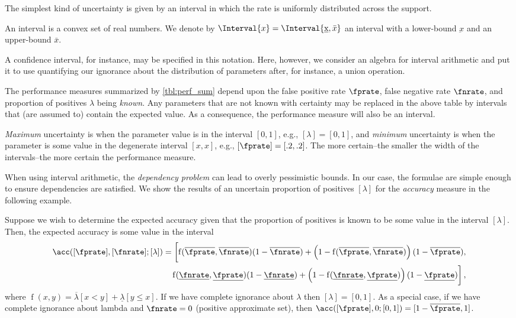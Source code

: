 \documentclass[ ../main.tex]{subfiles}
\begin{document}
The simplest kind of uncertainty is given by an interval in which the rate is uniformly distributed across the support.
\begin{definition}
An interval is a convex set of real numbers.
We denote by $\Interval{x} = \Interval{\underbar{x},\bar{x}}$ an interval with a lower-bound $\underbar{x}$ and an upper-bound $\bar{x}$.
\end{definition}

A confidence interval, for instance, may be specified in this notation.
Here, however, we consider an algebra for interval arithmetic and put it to use quantifying our ignorance about the distribution of parameters after, for instance, a union operation.

The performance measures summarized by \cref{tbl:perf_sum} depend upon the false positive rate $\fprate$, false negative rate $\fnrate$, and proportion of positives $\lambda$ being \emph{known}.
Any parameters that are not known with certainty may be replaced in the above table by intervals that (are assumed to) contain the expected value.
As a consequence, the performance measure will also be an interval.

\emph{Maximum} uncertainty is when the parameter value is in the interval $[0,1]$, e.g., $[\lambda] = [0,1]$, and \emph{minimum} uncertainty is when the parameter is some value in the degenerate interval $[x,x]$, e.g., $[\fprate] = [.2,.2]$. The more certain--the smaller the width of the intervals--the more certain the performance measure.

When using interval arithmetic, the \emph{dependency problem} can lead to overly pessimistic bounds.
In our case, the formulae are simple enough to ensure dependencies are satisfied. We show the results of an uncertain proportion of positives $[\lambda]$ for the \emph{accuracy} measure in the following example.

\begin{example}
	Suppose we wish to determine the expected accuracy given that the proportion of positives is known to be some value in the interval 
	$[\lambda]$. Then, the expected accuracy is some value in the interval
	\begin{equation}
		\begin{split}
		\acc([\fprate],[\fnrate] ; [\lambda]) =
		\biggl[
		\operatorname{f}(\overline{\fprate},\overline{\fnrate})(1-\overline{\fnrate}) + 
		\left(1-\operatorname{f}(\overline{\fprate},\overline{\fnrate})\right)(1-\overline{\fprate}),\\
		\operatorname{f}(\underline{\fnrate},\underline{\fprate})(1-\underline{\fnrate}) + 
		\left(1-\operatorname{f}(\underline{\fnrate},\underline{\fprate})\right)(1-\underline{\fprate})
		\biggr]\,,
		\end{split}
		\end{equation}
		where $\operatorname{f}(x,y) = \overline{\lambda}[x < y] + 
		\underline{\lambda}[y \leq x]$. If we have complete ignorance about 
		$\lambda$ then $[\lambda] = [0,1]$. As a special case, if we have 
		complete 
		ignorance about lambda and $\fnrate = 0$ (positive approximate set), 
		then 
		$\acc([\fprate],0 ; [0,1]) = [1-\overline{\fprate}, 1]$.
\end{example}
\end{document}

